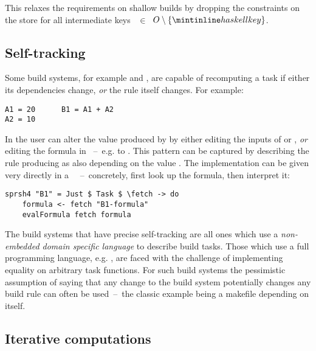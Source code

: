 \noindent
This relaxes the requirements on shallow builds by dropping the constraints on
the  store for all intermediate keys ~$\in$~$O\setminus \{\hs{key}\}$.

\subsection{Self-tracking}\label{sec-tracking-aspects}

Some build systems, for example \Excel and \Ninja, are capable of recomputing a
task if either its dependencies change, \emph{or} the rule itself changes. For
example:

\vspace{0.5mm}
\begin{verbatim}
A1 = 20      B1 = A1 + A2
A2 = 10
\end{verbatim}
\vspace{0.5mm}

\noindent
In \Excel the user can alter the value produced by  by either editing
the inputs of  or , \emph{or} editing the formula in
~--~e.g. to . This pattern can be captured by describing
the rule producing  as also depending on the value .
The implementation can be given very directly in a
~~--~concretely, first look up the formula, then interpret
it:

\vspace{0.5mm}
\begin{verbatim}
sprsh4 "B1" = Just $ Task $ \fetch -> do
    formula <- fetch "B1-formula"
    evalFormula fetch formula
\end{verbatim}
\vspace{0.5mm}

\noindent
The build systems that have precise self-tracking are all ones which use a
\emph{non-embedded domain specific language} to describe build tasks. Those
which use a full programming language, e.g. \Shake, are faced with the challenge
of implementing equality on arbitrary task functions. For such build systems the
pessimistic assumption of saying that any change to the build system potentially
changes any build rule can often be used~--~the classic example being a makefile
depending on itself.

\subsection{Iterative computations}\label{sec-iterative-compute}

